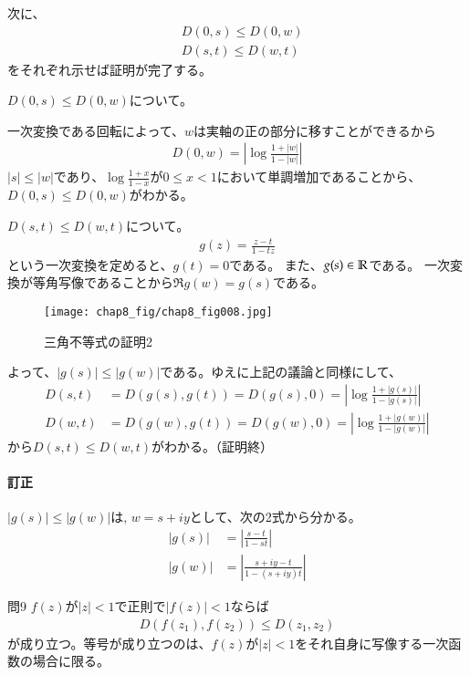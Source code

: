 次に、
\begin{align*}
    &D(0,s)\le D(0,w)\\
    &D(s,t)\le D(w,t)
\end{align*}
をそれぞれ示せば証明が完了する。

$D(0,s)\le D(0,w)$について。

一次変換である回転によって、$w$は実軸の正の部分に移すことができるから
\begin{align*}
    D(0,w)=\left|\log\frac{1+|w|}{1-|w|}\right|
\end{align*}
$|s|\le|w|$であり、$\log\frac{1+x}{1-x}$が$0\le x<1$において単調増加であることから、$D(0,s)\le D(0,w)$がわかる。


$D(s,t)\le D(w,t)$について。
\begin{align*}
    g(z)=\frac{z-t}{1-tz}
\end{align*}
という一次変換を定めると、$g(t)=0$である。
また、$g(s)\in\mathbb{R}$である。
一次変換が等角写像であることから$\Re g(w)=g(s)$である。
\begin{figure}[h]
    \centering
    \texttt{[image: chap8\_fig/chap8\_fig008.jpg]}
    \caption{三角不等式の証明2}
    \label{fig:chap8_tri2}
\end{figure}

よって、$|g(s)|\le|g(w)|$である。ゆえに上記の議論と同様にして、
\begin{align*}
    D(s,t)&=D(g(s),g(t))=D(g(s),0)=\left|\log\frac{1+|g(s)|}{1-|g(s)|}\right|\\
    D(w,t)&=D(g(w),g(t))=D(g(w),0)=\left|\log\frac{1+|g(w)|}{1-|g(w)|}\right|
\end{align*}
から$D(s,t)\le D(w,t)$がわかる。（証明終）
\paragraph{訂正}
$|g(s)|\le|g(w)|$は,
$w=s+iy$として、次の2式から分かる。
\begin{align*}
    |g(s)|
    &=\left|\frac{s-t}{1-st}\right|\\
    |g(w)|
    &=\left|\frac{s+iy-t}{1-(s+iy)t}\right|
\end{align*}

\newpage
\begin{mysimplebox}{問9}
    $f(z)$が$|z|<1$で正則で$|f(z)|<1$ならば
    \begin{align*}
        D(f(z_1),f(z_2))\le D(z_1,z_2)
    \end{align*}
    が成り立つ。等号が成り立つのは、$f(z)$が$|z|<1$をそれ自身に写像する一次函数の場合に限る。
\end{mysimplebox}
